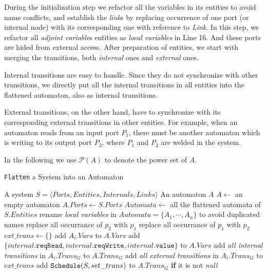 During the initialization step we refactor all the variables in its entities to avoid name conflicts, and establish the \emph{link}s by replacing occurrence of one port (or internal node) with its corresponding one with reference to \emph{Link}. In this step, we refactor all \emph{adjoint variable}s entities as \emph{local variables} in Line 16. And these ports are hided from external access.
After preparation of entities, we start with merging the transitions, both \emph{internal} ones and \emph{external} ones.

Internal transitions are easy to handle. Since they do not synchronize with other transitions, we directly put all the internal transitions in all entities into the flattened automaton, also as internal transitions.

External transitions, on the other hand, have to synchronize with its corresponding external transitions in other entities. For example, when an automaton reads from an input port $P_1$, there must be another automaton which is writing to its output port $P_2$, where $P_1$ and $P_2$ are welded in the system.

In the following we use $\mathcal{P}(A)$ to denote the power set of $A$.

\begin{algorithm}[H]
    \caption{\texttt{Flatten} a System into an Automaton}
    \label{alg:compose}
    \small
    \begin{algorithmic}[1]
        \REQUIRE A system $S=\langle Ports, Entities, Internals, Links\rangle$
        \ENSURE An automaton $A$
        \STATE $A \leftarrow $ an empty automaton
        \STATE $A.Ports\leftarrow S.Ports$
        \STATE $Automata\leftarrow$ all the flattened automata of $S.Entities$
        \STATE rename \emph{local variables} in $Automata=\{A_1,\cdots,A_n\}$ to avoid duplicated names
                \STATE replace all occurrance of $p_2$ with $p_1$
            \ELSE
                \STATE replace all occurrance of $p_1$ with $p_2$
            \ENDIF
        \ENDFOR
        \STATE $ext\_trans\leftarrow \{\}$
            \STATE add $A_i.Vars$ to $A.Vars$
                \STATE add $\{ internal\texttt{.reqRead}, internal\texttt{.reqWrite}, internal\texttt{.value}\}$ to $A.Vars$
            \ENDFOR
            \STATE add \emph{all internal transitions} in $A_i.Trans_G$ to $A.Trans_G$
            \STATE add \emph{all external transitions} in $A_i.Trans_G$ to $ext\_trans$
        \ENDFOR
            \STATE add $\mbox{\texttt{Schedule}}(S, set\_trans)$ to $A.Trans_G$ \textbf{if} it is not \emph{null}
        \ENDFOR
    \end{algorithmic}
\end{algorithm}

